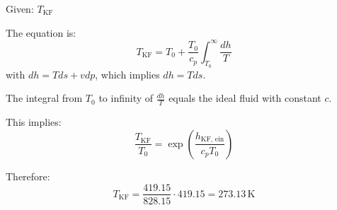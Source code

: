 Given: \( T_{\text{KF}} \)

The equation is:
\[ T_{\text{KF}} = T_{\text{0}} + \frac{T_{\text{0}}}{c_p} \int_{T_{\text{0}}}^{\infty} \frac{dh}{T} \]
with \( dh = T ds + v dp \), which implies \( dh = T ds \).

The integral from \( T_{\text{0}} \) to infinity of \( \frac{dh}{T} \) equals the ideal fluid with constant \( c \).

This implies:
\[ \frac{T_{\text{KF}}}{T_{\text{0}}} = \exp \left( \frac{h_{\text{KF, ein}}}{c_p T_{\text{0}}} \right) \]

Therefore:
\[ T_{\text{KF}} = \frac{419.15}{828.15} \cdot 419.15 = 273.13 \, \text{K} \]